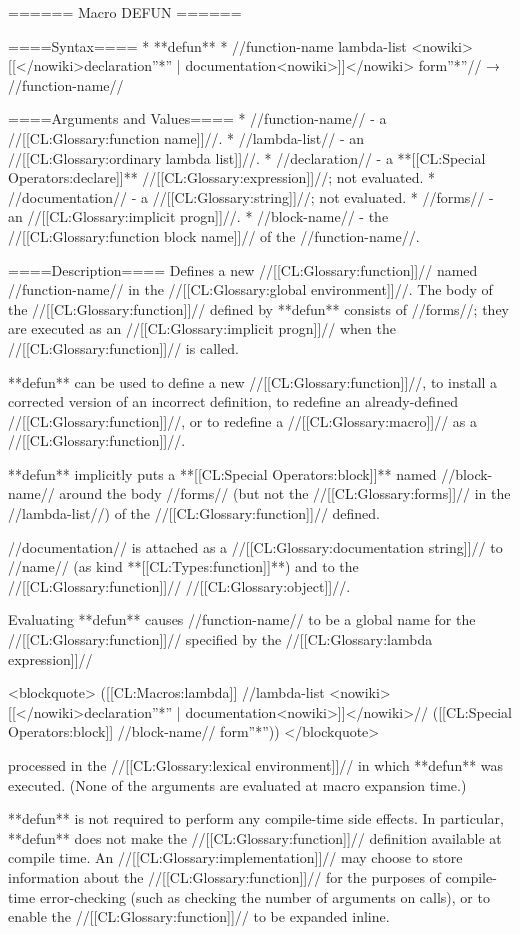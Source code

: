 ====== Macro DEFUN ======

====Syntax====
  * **defun** *  //function-name lambda-list <nowiki>[[</nowiki>declaration''*'' | documentation<nowiki>]]</nowiki> form''*''// → //function-name//

====Arguments and Values====
  * //function-name// - a //[[CL:Glossary:function name]]//.
  * //lambda-list// - an //[[CL:Glossary:ordinary lambda list]]//.
  * //declaration// - a **[[CL:Special Operators:declare]]** //[[CL:Glossary:expression]]//; not evaluated.
  * //documentation// - a //[[CL:Glossary:string]]//; not evaluated.
  * //forms// - an //[[CL:Glossary:implicit progn]]//.
  * //block-name// - the //[[CL:Glossary:function block name]]// of the //function-name//.

====Description====
Defines a new //[[CL:Glossary:function]]// named //function-name// in the //[[CL:Glossary:global environment]]//. The body of the //[[CL:Glossary:function]]// defined by **defun** consists of //forms//; they are executed as an //[[CL:Glossary:implicit progn]]// when the //[[CL:Glossary:function]]// is called.

**defun** can be used to define a new //[[CL:Glossary:function]]//, to install a corrected version of an incorrect definition, to redefine an already-defined //[[CL:Glossary:function]]//, or to redefine a //[[CL:Glossary:macro]]// as a //[[CL:Glossary:function]]//.

**defun** implicitly puts a **[[CL:Special Operators:block]]** named //block-name// around the body //forms// (but not the //[[CL:Glossary:forms]]// in the //lambda-list//) of the //[[CL:Glossary:function]]// defined.

//documentation// is attached as a //[[CL:Glossary:documentation string]]// to //name// (as kind **[[CL:Types:function]]**) and to the //[[CL:Glossary:function]]// //[[CL:Glossary:object]]//.

Evaluating **defun** causes //function-name// to be a global name for the //[[CL:Glossary:function]]// specified by the //[[CL:Glossary:lambda expression]]//

<blockquote>
([[CL:Macros:lambda]] //lambda-list <nowiki>[[</nowiki>declaration''*'' | documentation<nowiki>]]</nowiki>//
  ([[CL:Special Operators:block]] //block-name// form''*''))
</blockquote>

processed in the //[[CL:Glossary:lexical environment]]// in which **defun** was executed. (None of the arguments are evaluated at macro expansion time.)

**defun** is not required to perform any compile-time side effects. In particular, **defun** does not make the //[[CL:Glossary:function]]// definition available at compile time. An //[[CL:Glossary:implementation]]// may choose to store information about the //[[CL:Glossary:function]]// for the purposes of compile-time error-checking (such as checking the number of arguments on calls), or to enable the //[[CL:Glossary:function]]// to be expanded inline.

